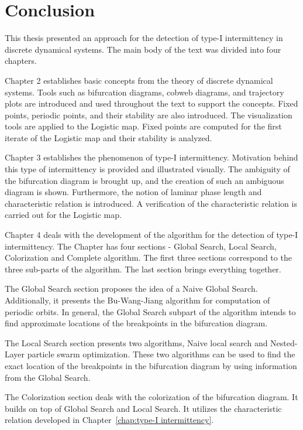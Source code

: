 \chapter{Conclusion}

This thesis presented an approach for the detection of type-I intermittency in discrete dynamical systems.
The main body of the text was divided into four chapters.
\par
Chapter 2 establishes basic concepts from the theory of discrete dynamical systems.
Tools such as bifurcation diagrams, cobweb diagrams, and trajectory plots are introduced and used throughout the text to support the concepts.
Fixed points, periodic points, and their stability are also introduced.
The visualization tools are applied to the Logistic map.
Fixed points are computed for the first iterate of the Logistic map and their stability is analyzed.
\par
Chapter 3 establishes the phenomenon of type-I intermittency.
Motivation behind this type of intermittency is provided and illustrated visually.
The ambiguity of the bifurcation diagram is brought up, and the creation of such an ambiguous diagram is shown.
Furthermore, the notion of laminar phase length and characteristic relation is introduced.
A verification of the characteristic relation is carried out for the Logistic map.
\par
Chapter 4 deals with the development of the algorithm for the detection of type-I intermittency.
The Chapter has four sections - Global Search, Local Search, Colorization and Complete algorithm.
The first three sections correspond to the three sub-parts of the algorithm.
The last section brings everything together.
\par
The Global Search section proposes the idea of a Naive Global Search.
Additionally, it presents the Bu-Wang-Jiang algorithm for computation of periodic orbits.
In general, the Global Search subpart of the algorithm intends to find approximate locations of the breakpoints in the bifurcation diagram.
\par
The Local Search section presents two algorithms, Naive local search and Nested-Layer particle swarm optimization.
These two algorithms can be used to find the exact location of the breakpoints in the bifurcation diagram by using information from the Global Search.
\par
The Colorization section deals with the colorization of the bifurcation diagram.
It builds on top of Global Search and Local Search.
It utilizes the characteristic relation developed in Chapter~\ref{chap:type-I intermittency}.
